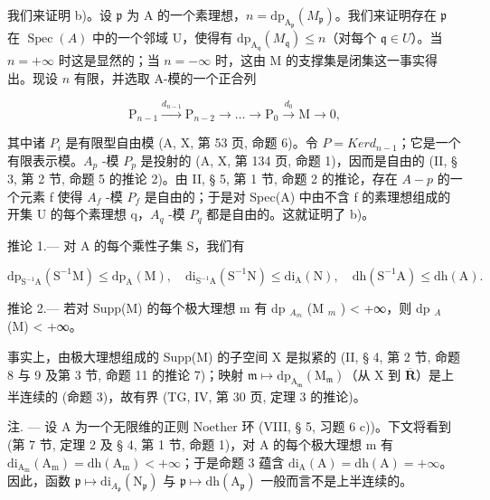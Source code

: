 我们来证明 b)。设 \(\mathfrak{p}\) 为 A 的一个素理想，\(n = \mathrm{dp}_{\mathrm{A}_{\mathfrak{p}}}(M_{\mathfrak{p}})\)。我们来证明存在 \(\mathfrak{p}\) 在 \(\operatorname{Spec}(A)\) 中的一个邻域 U，使得有 \(\mathrm{dp}_{\mathrm{A}_{\mathfrak{q}}}(M_{\mathfrak{q}}) \leqslant n\)（对每个 \(\mathfrak{q} \in U\)）。当 \(n = +\infty\) 时这是显然的；当 \(n = -\infty\) 时，这由 M 的支撑集是闭集这一事实得出。现设 \(n\) 有限，并选取 A-模的一个正合列

\[
\mathrm{P} _ {n - 1} \stackrel {d _ {n - 1}} {\longrightarrow} \mathrm{P} _ {n - 2} \longrightarrow \dots \longrightarrow \mathrm{P} _ {0} \stackrel {d _ {0}} {\longrightarrow} \mathrm{M} \rightarrow 0,
\]

其中诸 \(P_{i}\) 是有限型自由模 (A, X, 第 53 页, 命题 6)。令 \(P = Ker d_{n-1}\)；它是一个有限表示模。\(A_{p}\) -模 \(P_{p}\) 是投射的 (A, X, 第 134 页, 命题 1)，因而是自由的 (II, § 3, 第 2 节, 命题 5 的推论 2)。由 II, § 5, 第 1 节, 命题 2 的推论，存在 \(A - p\) 的一个元素 f 使得 \(A_{f}\) -模 \(P_{f}\) 是自由的；于是对 Spec(A) 中由不含 f 的素理想组成的开集 U 的每个素理想 q，\(A_{q}\) -模 \(P_{q}\) 都是自由的。这就证明了 b)。

推论 1.--- 对 A 的每个乘性子集 S，我们有

\[
\mathrm{dp} _ {\mathrm{S} ^ {- 1} \mathrm{A}} (\mathrm{S} ^ {- 1} \mathrm{M}) \leqslant \mathrm{dp} _ {\mathrm{A}} (\mathrm{M}), \quad \mathrm{di} _ {\mathrm{S} ^ {- 1} \mathrm{A}} (\mathrm{S} ^ {- 1} \mathrm{N}) \leqslant \mathrm{di} _ {\mathrm{A}} (\mathrm{N}), \quad \mathrm{dh} (\mathrm{S} ^ {- 1} \mathrm{A}) \leqslant \mathrm{dh} (\mathrm{A}).
\]

推论 2.--- 若对 Supp(M) 的每个极大理想 m 有 dp \(_{A_m}\) (M \(_m\) ) \textless{} +∞，则 dp \(_A\) (M) \textless{} +∞。

事实上，由极大理想组成的 Supp(M) 的子空间 X 是拟紧的 (II, § 4, 第 2 节, 命题 8 与 9 及第 3 节, 命题 11 的推论 7)；映射 \(\mathfrak{m} \mapsto \mathrm{dp}_{\mathrm{A}_{\mathfrak{m}}}(\mathrm{M}_{\mathfrak{m}})\)（从 X 到 \(\overline{\mathbf{R}}\)）是上半连续的 (命题 3)，故有界 (TG, IV, 第 30 页, 定理 3 的推论)。

注. --- 设 A 为一个无限维的正则 Noether 环 (VIII, § 5, 习题 6 c))。下文将看到 (第 7 节, 定理 2 及 § 4, 第 1 节, 命题 1)，对 A 的每个极大理想 m 有 \(\mathrm{di}_{\mathrm{A_m}}(\mathrm{A_m}) = \mathrm{dh}(\mathrm{A_m}) < +\infty\)；于是命题 3 蕴含 \(\mathrm{di}_{\mathrm{A}}(\mathrm{A}) = \mathrm{dh}(\mathrm{A}) = +\infty\)。因此，函数 \(\mathfrak{p} \mapsto \mathrm{di}_{A_{\mathfrak{p}}}(\mathrm{N}_{\mathfrak{p}})\) 与 \(\mathfrak{p} \mapsto \mathrm{dh}(\mathrm{A}_{\mathfrak{p}})\) 一般而言不是上半连续的。

